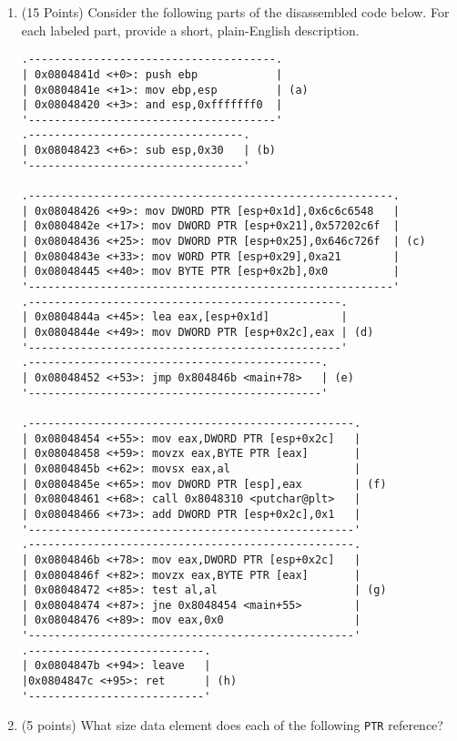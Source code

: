 \documentclass{article}[9pt]
\begin{document}
\begin{enumerate}
\item (15 Points) Consider the following parts of the disassembled code below. For
each labeled part, provide a short, plain-English description.

\begin{verbatim}
.--------------------------------------.
| 0x0804841d <+0>: push ebp            |
| 0x0804841e <+1>: mov ebp,esp         | (a)
| 0x08048420 <+3>: and esp,0xfffffff0  |
'--------------------------------------'
.---------------------------------.
| 0x08048423 <+6>: sub esp,0x30   | (b)
'---------------------------------'

.--------------------------------------------------------.
| 0x08048426 <+9>: mov DWORD PTR [esp+0x1d],0x6c6c6548   |
| 0x0804842e <+17>: mov DWORD PTR [esp+0x21],0x57202c6f  |
| 0x08048436 <+25>: mov DWORD PTR [esp+0x25],0x646c726f  | (c)
| 0x0804843e <+33>: mov WORD PTR [esp+0x29],0xa21        |
| 0x08048445 <+40>: mov BYTE PTR [esp+0x2b],0x0          |
'--------------------------------------------------------'
.------------------------------------------------.
| 0x0804844a <+45>: lea eax,[esp+0x1d]           |
| 0x0804844e <+49>: mov DWORD PTR [esp+0x2c],eax | (d)
'------------------------------------------------'
.---------------------------------------------.
| 0x08048452 <+53>: jmp 0x804846b <main+78>   | (e)
'---------------------------------------------'

.--------------------------------------------------.
| 0x08048454 <+55>: mov eax,DWORD PTR [esp+0x2c]   |
| 0x08048458 <+59>: movzx eax,BYTE PTR [eax]       |
| 0x0804845b <+62>: movsx eax,al                   |
| 0x0804845e <+65>: mov DWORD PTR [esp],eax        | (f)
| 0x08048461 <+68>: call 0x8048310 <putchar@plt>   |
| 0x08048466 <+73>: add DWORD PTR [esp+0x2c],0x1   |
'--------------------------------------------------'
.--------------------------------------------------.
| 0x0804846b <+78>: mov eax,DWORD PTR [esp+0x2c]   |
| 0x0804846f <+82>: movzx eax,BYTE PTR [eax]       |
| 0x08048472 <+85>: test al,al                     | (g)
| 0x08048474 <+87>: jne 0x8048454 <main+55>        |
| 0x08048476 <+89>: mov eax,0x0                    |
'--------------------------------------------------'
.---------------------------.
| 0x0804847b <+94>: leave   |
|0x0804847c <+95>: ret      | (h)
'---------------------------'
\end{verbatim}

\item (5 points) What size data element does each of the following \texttt{PTR} reference?


\end{enumerate}
\end{document}
